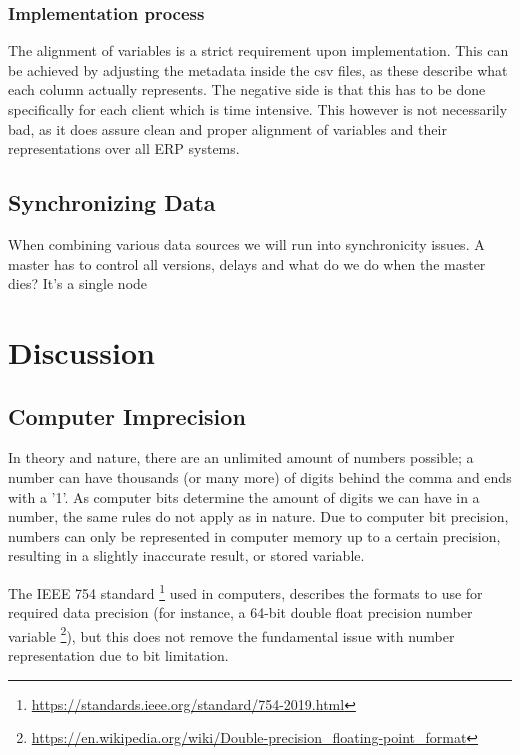 \documentclass[sigchi, nonacm]{acmart}
\begin{document}
\subsubsection{Implementation process}
The alignment of variables is a strict requirement upon implementation. This can be achieved by adjusting the metadata inside the csv files, as these describe what each column actually represents. The negative side is that this has to be done specifically for each client which is time intensive. This however is not necessarily bad, as it does assure clean and proper alignment of variables and their representations over all ERP systems.

\subsection{Synchronizing Data}
When combining various data sources we will run into synchronicity issues. A master has to control all versions, delays and what do we do when the master dies? It's a single node


\section{Discussion}

\subsection{Computer Imprecision}
In theory and nature, there are an unlimited amount of numbers possible; a number can have thousands (or many more) of digits behind the comma and ends with a '1'. As computer bits determine the amount of digits we can have in a number, the same rules do not apply as in nature. Due to computer bit precision, numbers can only be represented in computer memory up to a certain precision, resulting in a slightly inaccurate result, or stored variable.

The IEEE 754 standard \footnote{\raggedright{\url{https://standards.ieee.org/standard/754-2019.html}}} used in computers, describes the formats to use for required data precision (for instance, a 64-bit double float precision number variable \footnote{\raggedright{\url{https://en.wikipedia.org/wiki/Double-precision_floating-point_format}}}), but this does not remove the fundamental issue with number representation due to bit limitation.
\end{document}
